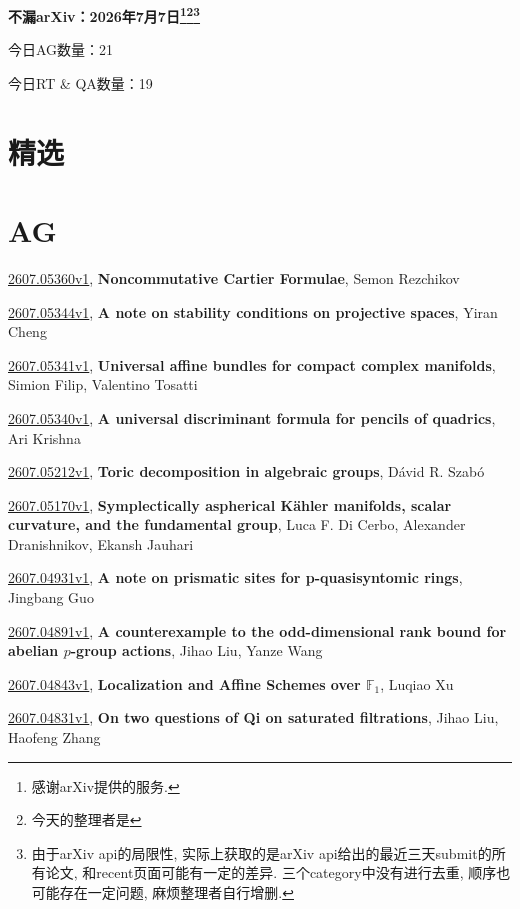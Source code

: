 \documentclass[9pt, a4paper]{article}
\theoremstyle{plain}
\theoremstyle{definition}
\theoremstyle{remark}
\newcommand{\arxiv}[3]{\href{https://arxiv.org/abs/#1}{#1}, \textbf{\textcolor{arxivblue}{#2}}, #3}
\newcommand{\AGnumber}{21}
\newcommand{\RTQAnumber}{19}
\newcommand{\NewestDate}{2026年7月7日}
\newcommand{\todayarXiver}{} %
\begin{document}
\begin{center}
    \Huge\textbf{不漏arXiv：\NewestDate\footnote{感谢arXiv提供的服务.}\footnote{今天的整理者是\todayarXiver}\footnote{由于arXiv api的局限性, 实际上获取的是arXiv api给出的最近三天submit的所有论文, 和recent页面可能有一定的差异. 三个category中没有进行去重, 顺序也可能存在一定问题, 麻烦整理者自行增删.}} \\
\end{center}

\setcounter{section}{-1}

\begin{center}
    今日AG数量：\AGnumber
    
    今日RT \& QA数量：\RTQAnumber
    
\end{center}


\section{精选}


\section{AG}
\arxiv{2607.05360v1}{Noncommutative Cartier Formulae}{Semon Rezchikov}

\arxiv{2607.05344v1}{A note on stability conditions on projective spaces}{Yiran Cheng}

\arxiv{2607.05341v1}{Universal affine bundles for compact complex manifolds}{Simion Filip, Valentino Tosatti}

\arxiv{2607.05340v1}{A universal discriminant formula for pencils of quadrics}{Ari Krishna}

\arxiv{2607.05212v1}{Toric decomposition in algebraic groups}{Dávid R. Szabó}

\arxiv{2607.05170v1}{Symplectically aspherical Kähler manifolds, scalar curvature, and the fundamental group}{Luca F. Di Cerbo, Alexander Dranishnikov, Ekansh Jauhari}

\arxiv{2607.04931v1}{A note on prismatic sites for p-quasisyntomic rings}{Jingbang Guo}

\arxiv{2607.04891v1}{A counterexample to the odd-dimensional rank bound for abelian \texorpdfstring{$p$}{p}-group actions}{Jihao Liu, Yanze Wang}

\arxiv{2607.04843v1}{Localization and Affine Schemes over $\mathbb{F}_1$}{Luqiao Xu}

\arxiv{2607.04831v1}{On two questions of Qi on saturated filtrations}{Jihao Liu, Haofeng Zhang}
\end{document}
